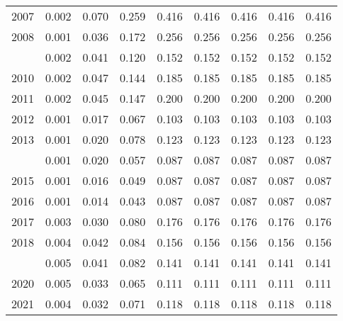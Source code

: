 \documentclass[
]{article}
\begin{document}
\begin{longtable}[t]{lrrrrrrrr}
2007 & 0.002 & 0.070 & 0.259 & 0.416 & 0.416 & 0.416 & 0.416 & 0.416\\
2008 & 0.001 & 0.036 & 0.172 & 0.256 & 0.256 & 0.256 & 0.256 & 0.256\\
\addlinespace
2009 & 0.002 & 0.041 & 0.120 & 0.152 & 0.152 & 0.152 & 0.152 & 0.152\\
2010 & 0.002 & 0.047 & 0.144 & 0.185 & 0.185 & 0.185 & 0.185 & 0.185\\
2011 & 0.002 & 0.045 & 0.147 & 0.200 & 0.200 & 0.200 & 0.200 & 0.200\\
2012 & 0.001 & 0.017 & 0.067 & 0.103 & 0.103 & 0.103 & 0.103 & 0.103\\
2013 & 0.001 & 0.020 & 0.078 & 0.123 & 0.123 & 0.123 & 0.123 & 0.123\\
\addlinespace
2014 & 0.001 & 0.020 & 0.057 & 0.087 & 0.087 & 0.087 & 0.087 & 0.087\\
2015 & 0.001 & 0.016 & 0.049 & 0.087 & 0.087 & 0.087 & 0.087 & 0.087\\
2016 & 0.001 & 0.014 & 0.043 & 0.087 & 0.087 & 0.087 & 0.087 & 0.087\\
2017 & 0.003 & 0.030 & 0.080 & 0.176 & 0.176 & 0.176 & 0.176 & 0.176\\
2018 & 0.004 & 0.042 & 0.084 & 0.156 & 0.156 & 0.156 & 0.156 & 0.156\\
\addlinespace
2019 & 0.005 & 0.041 & 0.082 & 0.141 & 0.141 & 0.141 & 0.141 & 0.141\\
2020 & 0.005 & 0.033 & 0.065 & 0.111 & 0.111 & 0.111 & 0.111 & 0.111\\
2021 & 0.004 & 0.032 & 0.071 & 0.118 & 0.118 & 0.118 & 0.118 & 0.118\\*
\end{longtable}
\end{document}
